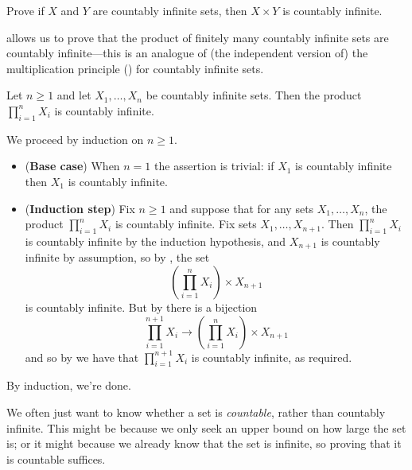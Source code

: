 \begin{exercise}
Prove if $X$ and $Y$ are countably infinite sets, then $X \times Y$ is countably infinite.
\end{exercise}

 allows us to prove that the product of finitely many countably infinite sets are countably infinite---this is an analogue of (the independent version of) the multiplication principle () for countably infinite sets.

\begin{proposition}
\label{propFiniteProductOfCountableSetsIsCountable}
Let $n \ge 1$ and let $X_1, \dots, X_n$ be countably infinite sets. Then the product $\displaystyle \prod_{i=1}^n X_i$ is countably infinite.
\end{proposition}
\begin{cproof}
We proceed by induction on $n \ge 1$.
\begin{itemize}
\item (\textbf{Base case}) When $n=1$ the assertion is trivial: if $X_1$ is countably infinite then $X_1$ is countably infinite.
\item (\textbf{Induction step}) Fix $n \ge 1$ and suppose that for any sets $X_1, \dots, X_n$, the product $\prod_{i=1}^n X_i$ is countably infinite. Fix sets $X_1, \dots, X_{n+1}$. Then $\prod_{i=1}^n X_i$ is countably infinite by the induction hypothesis, and $X_{n+1}$ is countably infinite by assumption, so by , the set
\[ \left( \prod_{i=1}^n X_i \right) \times X_{n+1} \]
is countably infinite. But by  there is a bijection 
\[ \prod_{i=1}^{n+1} X_i \to \left( \prod_{i=1}^n X_i \right) \times X_{n+1} \]
and so by  we have that $\prod_{i=1}^{n+1} X_i$ is countably infinite, as required.
\end{itemize}
By induction, we're done.
\end{cproof}

We often just want to know whether a set is \textit{countable}, rather than countably infinite. This might be because we only seek an upper bound on how large the set is; or it might because we already know that the set is infinite, so proving that it is countable suffices.

